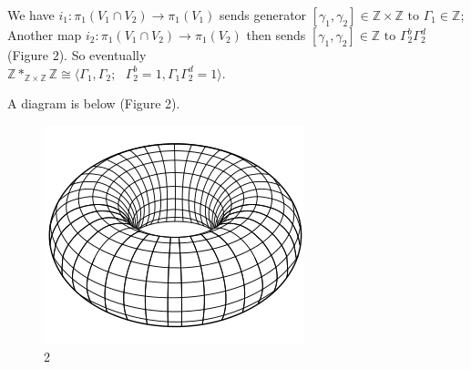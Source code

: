 \documentclass[11pt]{article}
\def\Z{{\mathbb Z}}
\theoremstyle{remark}
\begin{document}
We have $i_1:\pi_1(V_1\cap V_2)  \rightarrow \pi_1(V_1) $ sends generator $[\gamma_1,\gamma_2]\in \Z \times \Z \textrm{ to } \Gamma_1 \in \Z$;  Another map $i_2:\pi_1(V_1\cap V_2) \rightarrow \pi_1(V_2) $ then sends $[\gamma_1,\gamma_2]\in \Z \textrm{ to    } \Gamma_2^{b}\Gamma_2^{d} $ (Figure $2$).  So eventually \\ $\Z*_{\Z\times \Z} \Z \cong \langle \Gamma_1,\Gamma_2; \textrm{   }\Gamma_2^b=1,\Gamma_1\Gamma_2^d=1\rangle$. 


A  diagram is below (Figure 2).
    \begin{figure}[h!]
    \centering
    \includegraphics[scale=0.5]{Simple_Torus_svg}
    \caption{2}
    \end{figure}
\end{document}
